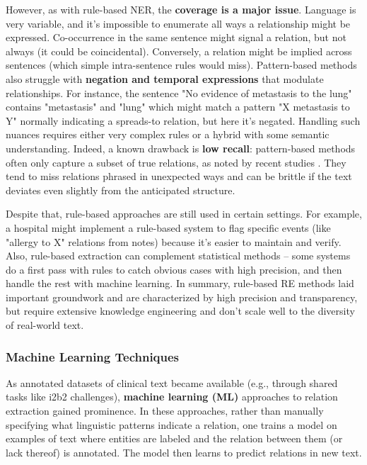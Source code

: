 However, as with rule-based NER, the \textbf{coverage is a major issue}. Language is very variable, and it's impossible to enumerate all ways a relationship might be expressed. Co-occurrence in the same sentence might signal a relation, but not always (it could be coincidental). Conversely, a relation might be implied across sentences (which simple intra-sentence rules would miss). Pattern-based methods also struggle with \textbf{negation and temporal expressions} that modulate relationships. For instance, the sentence "No evidence of metastasis to the lung" contains "metastasis" and "lung" which might match a pattern "X metastasis to Y" normally indicating a spreads-to relation, but here it's negated. Handling such nuances requires either very complex rules or a hybrid with some semantic understanding. Indeed, a known drawback is \textbf{low recall}: pattern-based methods often only capture a subset of true relations, as noted by recent studies \cite{Laue2024}. They tend to miss relations phrased in unexpected ways and can be brittle if the text deviates even slightly from the anticipated structure.

Despite that, rule-based approaches are still used in certain settings. For example, a hospital might implement a rule-based system to flag specific events (like "allergy to X" relations from notes) because it's easier to maintain and verify. Also, rule-based extraction can complement statistical methods – some systems do a first pass with rules to catch obvious cases with high precision, and then handle the rest with machine learning. In summary, rule-based RE methods laid important groundwork and are characterized by high precision and transparency, but require extensive knowledge engineering and don't scale well to the diversity of real-world text.

\subsubsection{Machine Learning Techniques}

As annotated datasets of clinical text became available (e.g., through shared tasks like i2b2 challenges), \textbf{machine learning (ML)} approaches to relation extraction gained prominence. In these approaches, rather than manually specifying what linguistic patterns indicate a relation, one trains a model on examples of text where entities are labeled and the relation between them (or lack thereof) is annotated. The model then learns to predict relations in new text.

